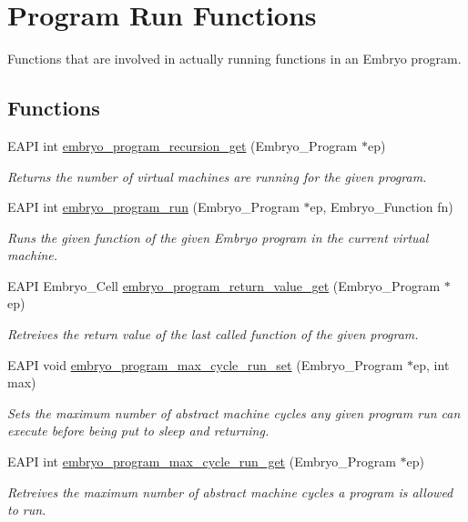 \hypertarget{group__Embryo__Run__Group}{
\section{Program Run Functions}
\label{group__Embryo__Run__Group}
}
Functions that are involved in actually running functions in an Embryo program.  
\subsection*{Functions}
\begin{CompactItemize}
\item 
EAPI int \hyperlink{group__Embryo__Run__Group_g4497fa4413a00d7f482772cdc6f7309d}{embryo\_\-program\_\-recursion\_\-get} (Embryo\_\-Program $\ast$ep)
\begin{CompactList}\small\item\em Returns the number of virtual machines are running for the given program. \item\end{CompactList}\item 
EAPI int \hyperlink{group__Embryo__Run__Group_ga061469476a430fd33e89951300fd62a}{embryo\_\-program\_\-run} (Embryo\_\-Program $\ast$ep, Embryo\_\-Function fn)
\begin{CompactList}\small\item\em Runs the given function of the given Embryo program in the current virtual machine. \item\end{CompactList}\item 
EAPI Embryo\_\-Cell \hyperlink{group__Embryo__Run__Group_g91a7c05bafd22e94d776a117a297201d}{embryo\_\-program\_\-return\_\-value\_\-get} (Embryo\_\-Program $\ast$ep)
\begin{CompactList}\small\item\em Retreives the return value of the last called function of the given program. \item\end{CompactList}\item 
EAPI void \hyperlink{group__Embryo__Run__Group_g493d2e507082b46cdbc57708a1f6e239}{embryo\_\-program\_\-max\_\-cycle\_\-run\_\-set} (Embryo\_\-Program $\ast$ep, int max)
\begin{CompactList}\small\item\em Sets the maximum number of abstract machine cycles any given program run can execute before being put to sleep and returning. \item\end{CompactList}\item 
EAPI int \hyperlink{group__Embryo__Run__Group_g2bf3e76b53faadccc60c11093c795425}{embryo\_\-program\_\-max\_\-cycle\_\-run\_\-get} (Embryo\_\-Program $\ast$ep)
\begin{CompactList}\small\item\em Retreives the maximum number of abstract machine cycles a program is allowed to run. \item\end{CompactList}\end{CompactItemize}


